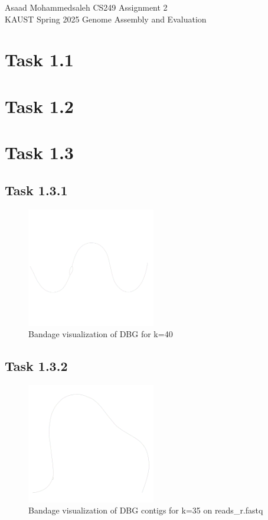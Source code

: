 \documentclass[12pt]{article}
\begin{document}
\noindent Asaad Mohammedsaleh \hfill CS249 Assignment 2\\
KAUST Spring 2025 \hfill Genome Assembly and Evaluation


\hrulefill


\section{Task 1.1}

\section{Task 1.2}

\section{Task 1.3}

\subsection{Task 1.3.1}

\begin{figure}[h]
    \centering
    \includegraphics[width=0.5\textwidth]{../toy_dataset/reads_b_k_40.png}
    \caption{Bandage visualization of DBG for k=40}
\end{figure} 

\subsection{Task 1.3.2}

\begin{figure}[h]
    \centering
    \includegraphics[width=0.5\textwidth]{../toy_dataset/r-k-35.png}
    \caption{Bandage visualization of DBG contigs for k=35 on reads\_r.fastq}
\end{figure} 
\end{document}
